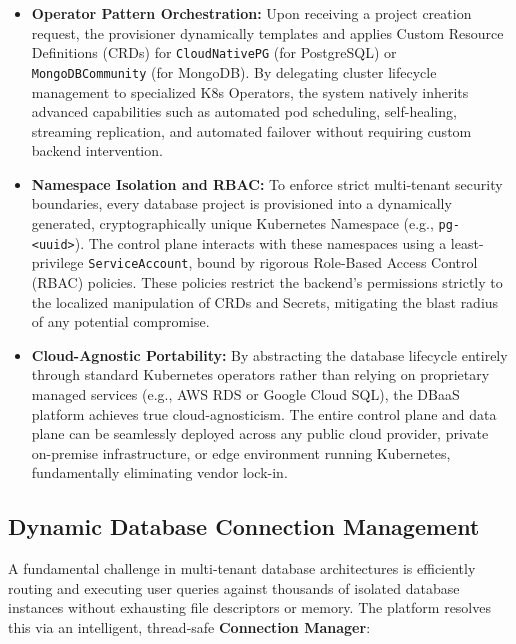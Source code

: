 \begin{itemize}
    \item \textbf{Operator Pattern Orchestration:} Upon receiving a project creation request, the provisioner dynamically templates and applies Custom Resource Definitions (CRDs) for \texttt{CloudNativePG} (for PostgreSQL) or \texttt{MongoDBCommunity} (for MongoDB). By delegating cluster lifecycle management to specialized K8s Operators, the system natively inherits advanced capabilities such as automated pod scheduling, self-healing, streaming replication, and automated failover without requiring custom backend intervention.
    \item \textbf{Namespace Isolation and RBAC:} To enforce strict multi-tenant security boundaries, every database project is provisioned into a dynamically generated, cryptographically unique Kubernetes Namespace (e.g., \texttt{pg-<uuid>}). The control plane interacts with these namespaces using a least-privilege \texttt{ServiceAccount}, bound by rigorous Role-Based Access Control (RBAC) policies. These policies restrict the backend's permissions strictly to the localized manipulation of CRDs and Secrets, mitigating the blast radius of any potential compromise.
    \item \textbf{Cloud-Agnostic Portability:} By abstracting the database lifecycle entirely through standard Kubernetes operators rather than relying on proprietary managed services (e.g., AWS RDS or Google Cloud SQL), the DBaaS platform achieves true cloud-agnosticism. The entire control plane and data plane can be seamlessly deployed across any public cloud provider, private on-premise infrastructure, or edge environment running Kubernetes, fundamentally eliminating vendor lock-in.
\end{itemize}

\subsection{Dynamic Database Connection Management}

A fundamental challenge in multi-tenant database architectures is efficiently routing and executing user queries against thousands of isolated database instances without exhausting file descriptors or memory. The platform resolves this via an intelligent, thread-safe \textbf{Connection Manager}:

